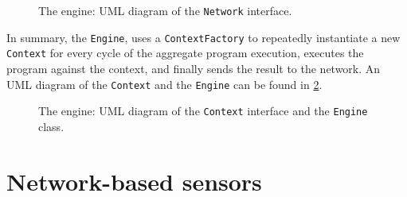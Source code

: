 \begin{figure}
    \centering
    \caption{The engine: \ac{UML} diagram of the \texttt{Network} interface.}
    \label{fig:engine-network-diagram}
    \bigskip
    \resizebox{\linewidth}{!}{
        
    }
\end{figure}

In summary, the \texttt{Engine}, uses a \texttt{ContextFactory} to repeatedly instantiate a new \texttt{Context} for every cycle of the aggregate program execution, executes the program against the context, and finally sends the result to the network.
%
An \ac{UML} diagram of the \texttt{Context} and the \texttt{Engine} can be found in \cref{fig:engine-diagram}.

\begin{figure}
    \centering
    \caption{The engine: \ac{UML} diagram of the \texttt{Context} interface and the \texttt{Engine} class.}
    \label{fig:engine-diagram}
    \bigskip
    \resizebox{\linewidth}{!}{
        
    }
\end{figure}


\section{Network-based sensors} \label{chap:design->sec:network-based-sensors}

